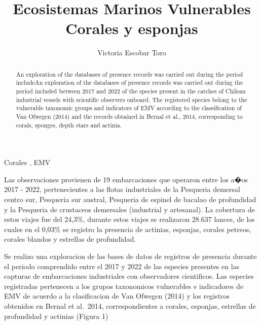 \documentclass[
  super,
  preprint,
  3p]{elsarticle}
\begin{document}
\begin{frontmatter}
\title{Ecosistemas Marinos Vulnerables \\\large{Corales y esponjas} }
\author[1]{Victoria Escobar Toro%
%
}



        
\begin{abstract}
An exploration of the databases of presence records was carried out
during the period includeAn exploration of the databases of presence
records was carried out during the period included between 2017 and 2022
of the species present in the catches of Chilean industrial vessels with
scientific observers onboard. The registered species belong to the
vulnerable taxonomic groups and indicators of EMV according to the
classification of Van Ofwegen (2014) and the records obtained in Bernal
et al., 2014, corresponding to corals, sponges, depth stars and actinia.
\end{abstract}





\begin{keyword}
    Corales \sep 
    EMV
\end{keyword}
\end{frontmatter}
    \ifdefined\Shaded\renewenvironment{Shaded}{\begin{tcolorbox}[boxrule=0pt, interior hidden, frame hidden, sharp corners, breakable, borderline west={3pt}{0pt}{shadecolor}, enhanced]}{\end{tcolorbox}}\fi

Las observaciones provienen de 19 embarcaciones que operaron entre los
a�os 2017 - 2022, pertenecientes a las flotas industriales de la
Pesqueria demersal centro sur, Pesqueria sur austral, Pesqueria de
espinel de bacalao de profundidad y la Pesqueria de crustaceos
demersales (industrial y artesanal). La cobertura de estos viajes fue
del 24,3\%, durante estos viajes se realizaron 28.637 lances, de los
cuales en el 0,03\% se registro la presencia de actinias, esponjas,
corales petreos, corales blandos y estrellas de profundidad.

Se realizo una exploracion de las bases de datos de registros de
presencia durante el periodo comprendido entre el 2017 y 2022 de las
especies presentes en las capturas de embarcaciones industriales con
observadores cientificos. Las especies registradas pertenecen a los
grupos taxonomicos vulnerables e indicadores de EMV de acuerdo a la
clasificacion de Van Ofwegen (2014) y los registros obtenidos en Bernal
et al.~2014, correspondientes a corales, esponjas, estrellas de
profundidad y actinias (Figura 1)
\end{document}
